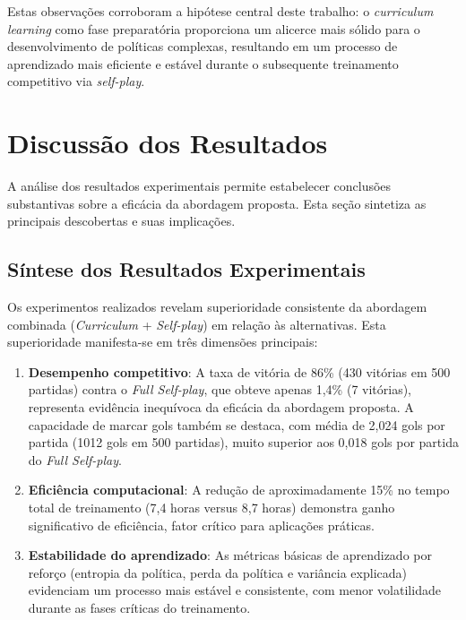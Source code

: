 Estas observações corroboram a hipótese central deste trabalho: o \textit{curriculum learning} como fase preparatória proporciona um alicerce mais sólido para o desenvolvimento de políticas complexas, resultando em um processo de aprendizado mais eficiente e estável durante o subsequente treinamento competitivo via \textit{self-play}.

\section{Discussão dos Resultados}
\label{sec:discussao_resultados}

A análise dos resultados experimentais permite estabelecer conclusões substantivas sobre a eficácia da abordagem proposta. Esta seção sintetiza as principais descobertas e suas implicações.

\subsection{Síntese dos Resultados Experimentais}

Os experimentos realizados revelam superioridade consistente da abordagem combinada (\textit{Curriculum} + \textit{Self-play}) em relação às alternativas. Esta superioridade manifesta-se em três dimensões principais:

\begin{enumerate}
    \item \textbf{Desempenho competitivo}: A taxa de vitória de 86\% (430 vitórias em 500 partidas) contra o \textit{Full Self-play}, que obteve apenas 1,4\% (7 vitórias), representa evidência inequívoca da eficácia da abordagem proposta. A capacidade de marcar gols também se destaca, com média de 2,024 gols por partida (1012 gols em 500 partidas), muito superior aos 0,018 gols por partida do \textit{Full Self-play}.

    \item \textbf{Eficiência computacional}: A redução de aproximadamente 15\% no tempo total de treinamento (7,4 horas versus 8,7 horas) demonstra ganho significativo de eficiência, fator crítico para aplicações práticas.

    \item \textbf{Estabilidade do aprendizado}: As métricas básicas de aprendizado por reforço (entropia da política, perda da política e variância explicada) evidenciam um processo mais estável e consistente, com menor volatilidade durante as fases críticas do treinamento.
\end{enumerate}

